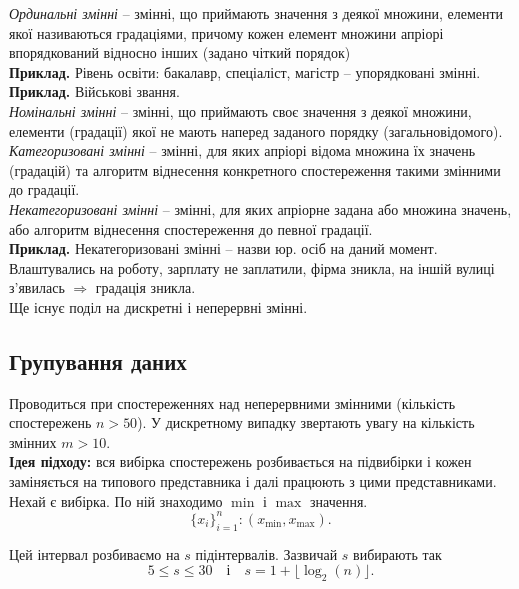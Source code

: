 \textit{Ординальні змінні} -- змінні, що приймають значення з деякої множини, елементи якої називаються градаціями, причому кожен елемент множини апріорі впорядкований відносно інших (задано чіткий порядок) \\

\textbf{Приклад.} Рівень освіти: бакалавр, спеціаліст, магістр -- упорядковані змінні.\\

\textbf{Приклад.} Військові звання.\\

\textit{Номінальні змінні} -- змінні, що приймають своє значення з деякої множини, елементи (градації) якої не мають наперед заданого порядку (загальновідомого). \\

\textit{Категоризовані змінні} -- змінні, для яких апріорі відома множина їх значень (градацій) та алгоритм віднесення конкретного спостереження такими змінними до градації. \\
 
\textit{Некатегоризовані змінні} -- змінні, для яких апріорне задана або множина значень, або алгоритм віднесення спостереження до певної градації. \\

\textbf{Приклад.} Некатегоризовані змінні -- назви юр. осіб на даний момент. Влаштувались на роботу, зарплату не заплатили, фірма зникла, на іншій вулиці з'явилась $\Rightarrow$ градація зникла. \\

Ще існує поділ на дискретні і неперервні змінні.

\subsection{Групування даних}

Проводиться при спостереженнях над неперервними змінними (кількість спостережень $n > 50$). У дискретному випадку звертають увагу на кількість змінних $m > 10$. \\

\textbf{Ідея підходу:} вся вибірка спостережень розбивається на підвибірки і кожен заміняється на типового представника і далі працюють з цими представниками. \\

Нехай є вибірка. По ній знаходимо $\min$ і $\max$ значення.  \[ \{x_i\}_{i=1}^n: (x_{\min}, x_{\max}).\]

Цей інтервал розбиваємо на $s$ підінтервалів. Зазвичай $s$ вибирають так \[ 5 \le s \le 30 \quad \text{і} \quad s = 1 + \lfloor \log_2(n) \rfloor. \]

